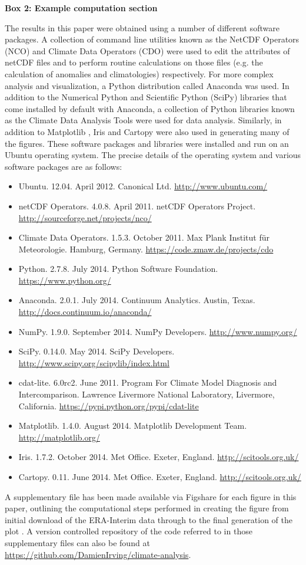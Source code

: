 \textbf{Box 2: Example computation section}

The results in this paper were obtained using a number of different software packages. A collection of command line utilities known as the NetCDF Operators (NCO) and Climate Data Operators (CDO) were used to edit the attributes of netCDF files and to perform routine calculations on those files (e.g. the calculation of anomalies and climatologies) respectively. For more complex analysis and visualization, a Python distribution called Anaconda was used. In addition to the Numerical Python \citep[NumPy;][]{VanDerWalt2011} and Scientific Python (SciPy) libraries that come installed by default with Anaconda, a collection of Python libraries known as the Climate Data Analysis Tools \citep[CDAT;][]{Doutriaux2009} were used for data analysis. Similarly, in addition to Matplotlib \citep[the default Python plotting library;][]{Hunter2007}, Iris and Cartopy were also used in generating many of the figures. These software packages and libraries were installed and run on an Ubuntu operating system. The precise details of the operating system and various software packages are as follows:
\begin{itemize}
\item Ubuntu. 12.04. April 2012. Canonical Ltd. \url{http://www.ubuntu.com/}
\item netCDF Operators. 4.0.8. April 2011. netCDF Operators Project. \url{http://sourceforge.net/projects/nco/}
\item Climate Data Operators. 1.5.3. October 2011. Max Plank Institut f{\"u}r Meteorologie. Hamburg, Germany. \url{https://code.zmaw.de/projects/cdo}
\item Python. 2.7.8. July 2014. Python Software Foundation. \url{https://www.python.org/}
\item Anaconda. 2.0.1. July 2014. Continuum Analytics. Austin, Texas. \url{http://docs.continuum.io/anaconda/}
\item NumPy. 1.9.0. September 2014. NumPy Developers. \url{http://www.numpy.org/}
\item SciPy. 0.14.0. May 2014. SciPy Developers. \url{http://www.scipy.org/scipylib/index.html}
\item cdat-lite. 6.0rc2. June 2011. Program For Climate Model Diagnosis and Intercomparison. Lawrence Livermore National Laboratory, Livermore, California. \url{https://pypi.python.org/pypi/cdat-lite}
\item Matplotlib. 1.4.0. August 2014. Matplotlib Development Team. \url{http://matplotlib.org/}
\item Iris. 1.7.2. October 2014. Met Office. Exeter, England. \url{http://scitools.org.uk/}
\item Cartopy. 0.11. June 2014. Met Office. Exeter, England. \url{http://scitools.org.uk/}
\end{itemize}

A supplementary file has been made available via Figshare for each figure in this paper, outlining the computational steps performed in creating the figure from initial download of the ERA-Interim data through to the final generation of the plot \citep{Irving2015a}. A version controlled repository of the code referred to in those supplementary files can also be found at \url{https://github.com/DamienIrving/climate-analysis}.